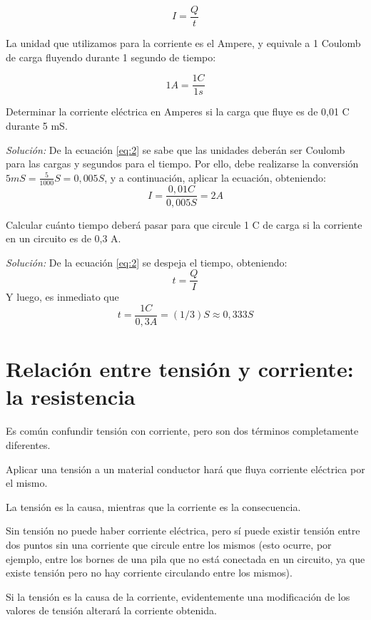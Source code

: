 \begin{equation}
\label{eq:2}
	I=\frac{Q}{t}
\end{equation}

La unidad que utilizamos para la corriente es el Ampere, y equivale a 1 Coulomb de carga fluyendo durante 1 segundo de tiempo:

$$ 1A = \frac{1C}{1s} $$

\begin{ejemplo}
	Determinar la corriente eléctrica en Amperes si la carga que fluye es de 0,01 C durante 5 mS.
	
	\emph{Solución:} De la ecuación \ref{eq:2} se sabe que las unidades deberán ser Coulomb para las cargas y segundos para el tiempo. Por ello, debe realizarse la conversión $5mS=\frac{5}{1000} S =0,005 S$, y a continuación, aplicar la ecuación, obteniendo: $$ I= \frac{0,01 C}{0,005 S} = 2 A $$
\end{ejemplo}

\begin{ejemplo}
	Calcular cuánto tiempo deberá pasar para que circule 1 C de carga si la corriente en un circuito es de 0,3 A.
	
	\emph{Solución:} De la ecuación \ref{eq:2} se despeja el tiempo, obteniendo: 
	\begin{equation}
		\label{eq:3}
		t=\frac{Q}{I}
	\end{equation}
	Y luego, es inmediato que $$ t=\frac{1C}{0,3A}=(1/3)S \approx 0,333 S $$
\end{ejemplo}

\section{Relación entre tensión y corriente: la resistencia}

Es común confundir tensión con corriente, pero son dos términos completamente diferentes.

Aplicar una tensión a un material conductor hará que fluya corriente eléctrica por el mismo.

La tensión es la causa, mientras que la corriente es la consecuencia.

Sin tensión no puede haber corriente eléctrica, pero sí puede existir tensión entre dos puntos sin una corriente que circule entre los mismos (esto ocurre, por ejemplo, entre los bornes de una pila que no está conectada en un circuito, ya que existe tensión pero no hay corriente circulando entre los mismos).

Si la tensión es la causa de la corriente, evidentemente una modificación de los valores de tensión alterará la corriente obtenida.

